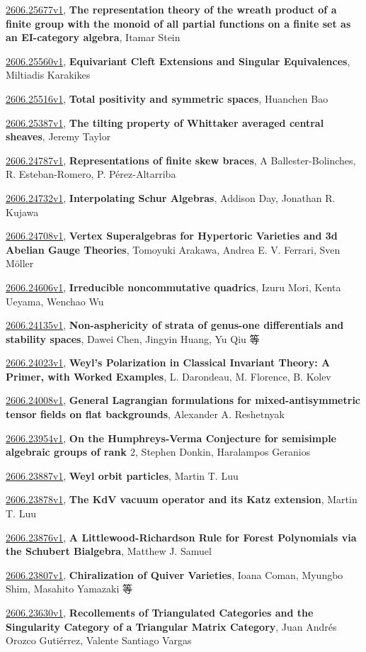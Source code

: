\documentclass[9pt, a4paper]{article}
\theoremstyle{plain}
\theoremstyle{definition}
\theoremstyle{remark}
\newcommand{\arxiv}[3]{\href{https://arxiv.org/abs/#1}{#1}, \textbf{\textcolor{arxivblue}{#2}}, #3}
\begin{document}
\arxiv{2606.25677v1}{The representation theory of the wreath product of a finite group with the monoid of all partial functions on a finite set as an EI-category algebra}{Itamar Stein}

\arxiv{2606.25560v1}{Equivariant Cleft Extensions and Singular Equivalences}{Miltiadis Karakikes}

\arxiv{2606.25516v1}{Total positivity and symmetric spaces}{Huanchen Bao}

\arxiv{2606.25387v1}{The tilting property of Whittaker averaged central sheaves}{Jeremy Taylor}

\arxiv{2606.24787v1}{Representations of finite skew braces}{A Ballester-Bolinches, R. Esteban-Romero, P. Pérez-Altarriba}

\arxiv{2606.24732v1}{Interpolating Schur Algebras}{Addison Day, Jonathan R. Kujawa}

\arxiv{2606.24708v1}{Vertex Superalgebras for Hypertoric Varieties and 3d Abelian Gauge Theories}{Tomoyuki Arakawa, Andrea E. V. Ferrari, Sven Möller}

\arxiv{2606.24606v1}{Irreducible noncommutative quadrics}{Izuru Mori, Kenta Ueyama, Wenchao Wu}

\arxiv{2606.24135v1}{Non-asphericity of strata of genus-one differentials and stability spaces}{Dawei Chen, Jingyin Huang, Yu Qiu 等}

\arxiv{2606.24023v1}{Weyl's Polarization in Classical Invariant Theory: A Primer, with Worked Examples}{L. Darondeau, M. Florence, B. Kolev}

\arxiv{2606.24008v1}{General Lagrangian formulations for mixed-antisymmetric tensor fields on flat backgrounds}{Alexander A. Reshetnyak}

\arxiv{2606.23954v1}{On the Humphreys-Verma Conjecture for semisimple algebraic groups of rank $2$}{Stephen Donkin, Haralampos Geranios}

\arxiv{2606.23887v1}{Weyl orbit particles}{Martin T. Luu}

\arxiv{2606.23878v1}{The KdV vacuum operator and its Katz extension}{Martin T. Luu}

\arxiv{2606.23876v1}{A Littlewood-Richardson Rule for Forest Polynomials via the Schubert Bialgebra}{Matthew J. Samuel}

\arxiv{2606.23807v1}{Chiralization of Quiver Varieties}{Ioana Coman, Myungbo Shim, Masahito Yamazaki 等}

\arxiv{2606.23630v1}{Recollements of Triangulated Categories and the Singularity Category of a Triangular Matrix Category}{Juan Andrés Orozco Gutiérrez, Valente Santiago Vargas}
\end{document}
